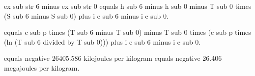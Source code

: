 ex sub str 6 minus ex sub str 0 equals h sub 6 minus h sub 0 minus T sub 0 times (S sub 6 minus S sub 0) plus i e sub 6 minus i e sub 0.  

equals c sub p times (T sub 6 minus T sub 0) minus T sub 0 times (c sub p times (ln (T sub 6 divided by T sub 0))) plus i e sub 6 minus i e sub 0.  

equals negative 26405.586 kilojoules per kilogram equals negative 26.406 megajoules per kilogram.